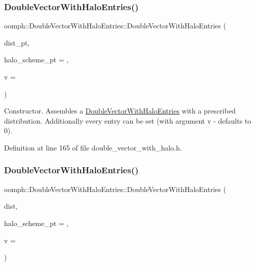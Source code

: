 \subsubsection{\texorpdfstring{Double\+Vector\+With\+Halo\+Entries()}{DoubleVectorWithHaloEntries()}\hspace{0.1cm}{\footnotesize\ttfamily [2/5]}}
{\footnotesize\ttfamily oomph\+::\+Double\+Vector\+With\+Halo\+Entries\+::\+Double\+Vector\+With\+Halo\+Entries (\begin{DoxyParamCaption}\item[{const \hyperlink{classoomph_1_1LinearAlgebraDistribution}{Linear\+Algebra\+Distribution} $\ast$const \&}]{dist\+\_\+pt,  }\item[{\hyperlink{classoomph_1_1DoubleVectorHaloScheme}{Double\+Vector\+Halo\+Scheme} $\ast$const \&}]{halo\+\_\+scheme\+\_\+pt = {},  }\item[{const double \&}]{v = {} }\end{DoxyParamCaption})\hspace{0.3cm}{\ttfamily [inline]}}



Constructor. Assembles a \hyperlink{classoomph_1_1DoubleVectorWithHaloEntries}{Double\+Vector\+With\+Halo\+Entries} with a prescribed distribution. Additionally every entry can be set (with argument v -\/ defaults to 0). 



Definition at line 165 of file double\+\_\+vector\+\_\+with\+\_\+halo.\+h.

\mbox{\label{classoomph_1_1DoubleVectorWithHaloEntries_a28df73429d7ab3f349849c33a610df8c}} 
\subsubsection{\texorpdfstring{Double\+Vector\+With\+Halo\+Entries()}{DoubleVectorWithHaloEntries()}\hspace{0.1cm}{\footnotesize\ttfamily [3/5]}}
{\footnotesize\ttfamily oomph\+::\+Double\+Vector\+With\+Halo\+Entries\+::\+Double\+Vector\+With\+Halo\+Entries (\begin{DoxyParamCaption}\item[{const \hyperlink{classoomph_1_1LinearAlgebraDistribution}{Linear\+Algebra\+Distribution} \&}]{dist,  }\item[{\hyperlink{classoomph_1_1DoubleVectorHaloScheme}{Double\+Vector\+Halo\+Scheme} $\ast$const \&}]{halo\+\_\+scheme\+\_\+pt = {},  }\item[{const double \&}]{v = {} }\end{DoxyParamCaption})\hspace{0.3cm}{\ttfamily [inline]}}



